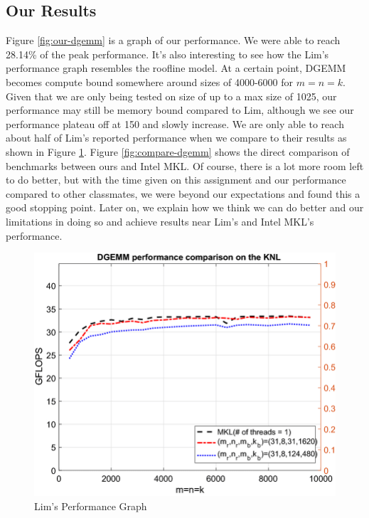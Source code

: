 \documentclass{article}
\begin{document}
\subsection{Our Results}
Figure \ref{fig:our-dgemm} is a graph of our performance. We were able to reach 28.14\% of the peak performance. It's also interesting to see how the Lim's performance graph resembles the roofline model. At a certain point, DGEMM becomes compute bound somewhere around sizes of 4000-6000 for $m=n=k$. Given that we are only being tested on size of up to a max size of 1025, our performance may still be memory bound compared to Lim, although we see our performance plateau off at 150 and slowly increase. We are only able to reach about half of Lim's reported performance when we compare to their results as shown in Figure \ref{fig:lim-dgemm}. Figure \ref{fig:compare-dgemm} shows the direct comparison of benchmarks between ours and Intel MKL. Of course, there is a lot more room left to do better, but with the time given on this assignment and our performance compared to other classmates, we were beyond our expectations and found this a good stopping point. Later on, we explain how we think we can do better and our limitations in doing so and achieve results near Lim's and Intel MKL's performance.

\begin{figure}[H]
	\centerline{\includegraphics[width=6in]{figures/DGEMM-performance-comparison-for-different-matrix-sizes-on-the-KNL.png}}
	\caption{Lim's Performance Graph \cite{10.1007/s10586-018-2810-y}}
	\label{fig:lim-dgemm}
\end{figure}
\end{document}

